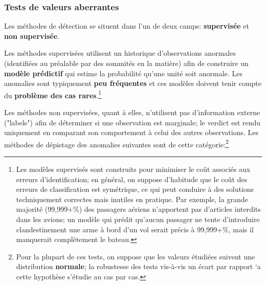 \subsubsection*{Tests de valeurs aberrantes} Les méthodes de d\'etection se situent dans l'un de deux camps: \textbf{supervis\'ee} et \textbf{non supervis\'ee}.
\par Les méthodes supervisées utilisent un historique d'ob\-ser\-va\-tions anormales (identifi\'ees au pr\'ealable par des sommit\'es en la mati\`ere) afin de construire un \textbf{mod\`ele pr\'edictif} qui estime la probabilité qu'une unité soit anormale. Les anomalies sont typiquement \textbf{peu fréquentes} et ces modèles doivent tenir compte du \textbf{problème des cas rares}.\footnote{Les modèles supervisés sont construits pour minimiser le co\^ut associ\'es aux erreurs d'identification; en g\'en\'eral, on suppose d'habitude que le coût des erreurs de classification est symétrique, ce qui peut conduire à des solutions techniquement correctes mais inutiles en pratique. Par exemple, la grande majorité (99,999+\%) des passagers aériens n'apportent pas d'articles interdits dans les avions; un modèle qui prédit qu'aucun passager ne tente d'introduire clandestinement une arme à bord d'un vol serait précis à 99,999+\%, mais il manquerait complètement le bateau.} \par Les méthodes non supervisées, quant \`a elles, n'utilisent pas d'information externe ("labels") afin de déterminer si une ob\-ser\-va\-tion est marginale; le verdict est rendu uniquement en comparant son comportement à celui des autres ob\-ser\-va\-tions.
\newpage\noindent Les m\'ethodes de d\'epistage des anomalies suivantes sont de cette cat\'egorie:\footnote{Pour la plupart de ces tests, on suppose que les valeurs \'etudi\'ees suivent une distribution \textbf{normale}; la robustesse des tests vis-\`a-vis un \'ecart par rapport `a cette hypoth\`ese s'\'etudie au cas par cas.}
